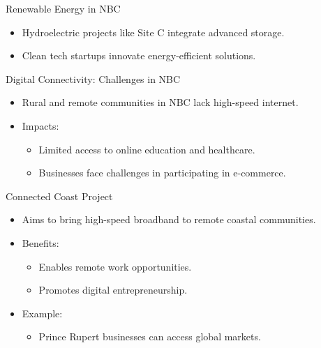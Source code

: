 \documentclass{beamer}
\begin{document}
\begin{frame}{Renewable Energy in NBC}
    \begin{itemize}
        \item Hydroelectric projects like Site C integrate advanced storage.
        \item Clean tech startups innovate energy-efficient solutions.
    \end{itemize}
\end{frame}

\begin{frame}{Digital Connectivity: Challenges in NBC}
    \begin{itemize}
        \item Rural and remote communities in NBC lack high-speed internet.
        \item Impacts:
        \begin{itemize}
            \item Limited access to online education and healthcare.
            \item Businesses face challenges in participating in e-commerce.
        \end{itemize}
    \end{itemize}
\end{frame}

\begin{frame}{Connected Coast Project}
    \begin{itemize}
        \item Aims to bring high-speed broadband to remote coastal communities.
        \item Benefits:
        \begin{itemize}
            \item Enables remote work opportunities.
            \item Promotes digital entrepreneurship.
        \end{itemize}
        \item Example:
        \begin{itemize}
            \item Prince Rupert businesses can access global markets.
        \end{itemize}
    \end{itemize}
\end{frame}
\end{document}
